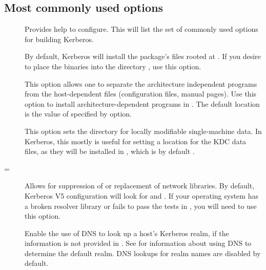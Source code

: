 \documentclass[letterpaper,10pt,english]{sphinxmanual}
\begin{document}
\subsection{Most commonly used options}
\label{\detokenize{build/options2configure:most-commonly-used-options}}\begin{description}
\item[{\sphinxstylestrong{-}}] \leavevmode
Provides help to configure.  This will list the set of commonly
used options for building Kerberos.

\item[{\sphinxstylestrong{-}}] \leavevmode
By default, Kerberos will install the package’s files rooted at
.  If you desire to place the binaries into the
directory , use this option.

\item[{\sphinxstylestrong{-}}] \leavevmode
This option allows one to separate the architecture independent
programs from the host-dependent files (configuration files,
manual pages).  Use this option to install architecture-dependent
programs in .  The default location is the value of
specified by \sphinxstylestrong{-} option.

\item[{\sphinxstylestrong{-}}] \leavevmode
This option sets the directory for locally modifiable
single-machine data.  In Kerberos, this mostly is useful for
setting a location for the KDC data files, as they will be
installed in , which is by default
.

\item[{\sphinxstylestrong{-}\sphinxstylestrong{-with-netlib}{[}=\sphinxstyleemphasis{libs}{]}}] \leavevmode
Allows for suppression of or replacement of network libraries.  By
default, Kerberos V5 configuration will look for  and
.  If your operating system has a broken resolver
library or fails to pass the tests in , you
will need to use this option.

\item[{\sphinxstylestrong{-}}] \leavevmode
Enable the use of DNS to look up a host’s Kerberos realm,
if the information is not provided in
.  See 
for information about using DNS to determine the default realm.
DNS lookups for realm names are disabled by default.


\end{description}
\end{document}
